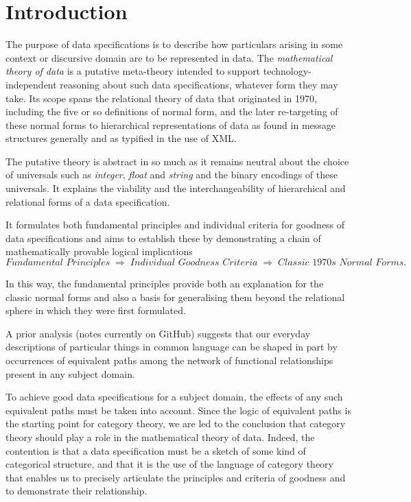 \section{Introduction}

The purpose of data specifications is to describe how particulars arising in some context or discursive domain
are to be represented in data. 
The \textit{mathematical theory of data} is a putative meta-theory 
intended to support technology-independent reasoning about such data specifications, whatever form they may take. 
Its scope spans the relational theory of data that originated in 1970, including the five or so definitions of normal form,
and the later re-targeting of these normal forms to hierarchical representations 
of data as found in message structures generally and as typified in the use of XML.

The putative theory is abstract in so much as it remains neutral about the choice of universals such as \textit{integer}, \textit{float} and \textit{string} and the binary encodings of these universals. 
It explains the viability and the interchangeability of hierarchical and relational forms of a data specification.  

It formulates both fundamental principles and individual criteria for goodness of data specifications and aims to establish these by demonstrating a chain of mathematically provable logical implications 
\[
\textit{Fundamental Principles}
\;\Longrightarrow\;
\textit{Individual Goodness Criteria}
\;\Longrightarrow\;
\textit{Classic 1970s Normal Forms}.
\]
 
In this way, the fundamental principles provide both an explanation for the classic normal forms and also a basis for generalising them beyond the relational sphere in which they were first formulated.

A prior analysis (notes currently on GitHub) suggests that our everyday descriptions of particular things in common language can be shaped in part by  occurrences of equivalent paths among the network of functional relationships present in any subject domain. 

To achieve good data specifications for a subject domain, the effects of any such equivalent paths must be taken into account. 
Since the logic of equivalent paths is the starting point for category theory, we are led to the conclusion that 
category theory should play a role in the mathematical theory of data. Indeed, the contention is that
a data specification must be a sketch of some kind of categorical structure, 
and that it is the use of the language of category theory that enables us to precisely articulate 
the principles and criteria of goodness and to demonstrate their relationship.


